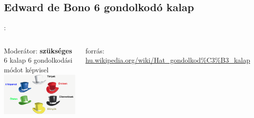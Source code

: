 \documentclass{beamer}
\begin{document}
\subsection{Edward de Bono 6 gondolkodó kalap}
\begin{frame}{\secname : \subsecname}
\begin{columns}
\centering
Moderátor: \textbf{szükséges} \\
\vspace{5mm}
6 kalap 6 gondolkodási módot képvisel
\centering
\includegraphics[scale=0.4]{figures/hatkalap.png}

\begin{footnotesize}
forrás: \url{hu.wikipedia.org/wiki/Hat_gondolkod\%C3\%B3_kalap}
\end{footnotesize}
\end{columns}
\end{frame}
\end{document}
